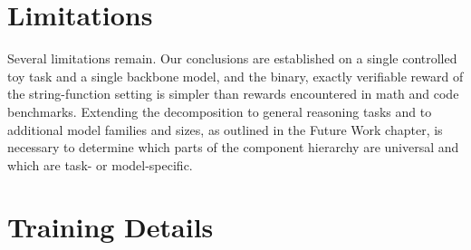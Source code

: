 \documentclass{article}
\begin{document}
\section*{Limitations}
Several limitations remain. Our conclusions are established on a single controlled toy task and a single backbone model, and the binary, exactly verifiable reward of the string-function setting is simpler than rewards encountered in math and code benchmarks. Extending the decomposition to general reasoning tasks and to additional model families and sizes, as outlined in the Future Work chapter, is necessary to determine which parts of the component hierarchy are universal and which are task- or model-specific.



\newpage
\appendix
\section{Training Details}



\newpage

\end{document}
